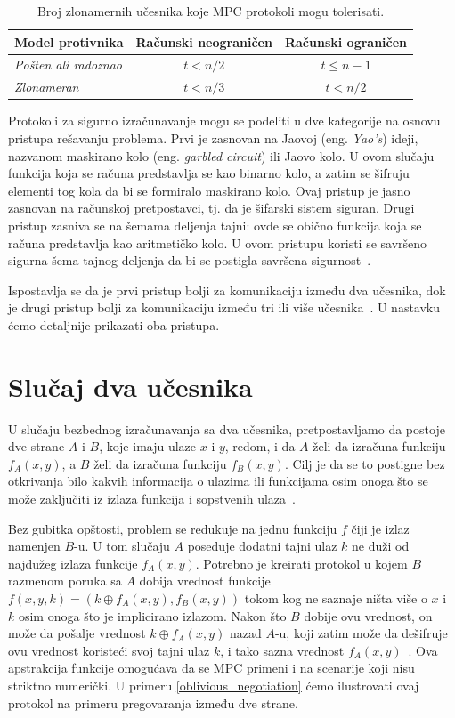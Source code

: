\begin{table}[h]
\centering
\begin{tabular}{|l|c|c|}
\hline
\textbf{Model protivnika} &
\textbf{Računski neograničen} &
\textbf{Računski ograničen} \\
\hline
\emph{Pošten ali radoznao} &
$t < n/2$ &
$t \le n-1$ \\
\hline
\emph{Zlonameran} &
$t < n/3$ &
$t < n/2$ \\
\hline
\end{tabular}
\caption{Broj zlonamernih učesnika koje MPC protokoli mogu tolerisati.}
\label{tab:mpc-security-thresholds}
\end{table}

Protokoli za sigurno izračunavanje mogu se podeliti u dve kategorije na osnovu pristupa rešavanju problema. Prvi je zasnovan na Jaovoj (eng. \textit{Yao's}) ideji, nazvanom maskirano kolo (eng. \textit{garbled circuit}) ili Jaovo kolo. 
U ovom slučaju funkcija koja se računa predstavlja se kao binarno kolo, a zatim se šifruju elementi tog kola da bi se formiralo maskirano kolo. Ovaj pristup je jasno zasnovan na računskoj pretpostavci, tj. da je šifarski sistem siguran. 
Drugi pristup zasniva se na šemama deljenja tajni: ovde se obično funkcija koja se računa predstavlja kao aritmetičko kolo. U ovom pristupu koristi se savršeno sigurna šema tajnog deljenja da bi se postigla savršena sigurnost~\cite{smart2016cryptography}. 

Ispostavlja se da je prvi pristup bolji za komunikaciju između dva učesnika, dok je drugi pristup bolji za komunikaciju između tri ili više učesnika~\cite{smart2016cryptography}. U nastavku ćemo detaljnije prikazati oba pristupa.

\section{Slučaj dva učesnika}

U slučaju bezbednog izračunavanja sa dva učesnika, pretpostavljamo da postoje dve strane $A$ i $B$, koje imaju ulaze $x$ i $y$, redom, i da $A$ želi da izračuna funkciju $f_A(x, y)$, a $B$ želi da izračuna funkciju $f_B(x, y)$. Cilj je da se to postigne bez otkrivanja bilo kakvih informacija o ulazima ili funkcijama osim onoga što se može zaključiti iz izlaza funkcija i sopstvenih ulaza~\cite{smart2016cryptography}. 

Bez gubitka opštosti, problem se redukuje na jednu funkciju $f$ čiji je izlaz namenjen $B$-u. U tom slučaju $A$ poseduje dodatni tajni ulaz $k$ ne duži od najdužeg izlaza funkcije $f_A(x, y)$. Potrebno je kreirati protokol u kojem $B$ razmenom poruka sa $A$ dobija vrednost funkcije $f(x, y, k) = (k \oplus f_A(x, y), f_B(x, y))$ tokom kog ne saznaje ništa više o $x$ i $k$ osim onoga što je implicirano izlazom. Nakon što $B$ dobije ovu vrednost, on može da pošalje vrednost $k \oplus f_A(x, y)$ nazad $A$-u, koji zatim može da dešifruje ovu vrednost koristeći svoj tajni ulaz $k$, i tako sazna vrednost $f_A(x, y)$~\cite{smart2016cryptography}. Ova apstrakcija funkcije omogućava da se MPC primeni i na scenarije koji nisu striktno numerički. U primeru \ref{oblivious_negotiation} ćemo ilustrovati ovaj protokol na primeru pregovaranja između dve strane.

